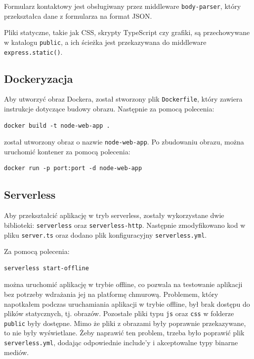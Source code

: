 \documentclass[a4paper,12pt]{article}
\begin{document}
Formularz kontaktowy jest obsługiwany przez middleware \texttt{body-parser}, który przekształca dane z formularza na format JSON.

Pliki statyczne, takie jak CSS, skrypty TypeScript czy grafiki, są przechowywane w katalogu \texttt{public}, a ich ścieżka jest przekazywana do middleware \texttt{express.static()}.

\subsection{Dockeryzacja}
Aby utworzyć obraz Dockera, został stworzony plik \texttt{Dockerfile}, który zawiera instrukcje dotyczące budowy obrazu. Następnie za pomocą polecenia:
\begin{lstlisting}
docker build -t node-web-app .
\end{lstlisting}
został utworzony obraz o nazwie \texttt{node-web-app}. Po zbudowaniu obrazu, można uruchomić kontener za pomocą polecenia:
\begin{lstlisting}
docker run -p port:port -d node-web-app
\end{lstlisting}

\subsection{Serverless}
Aby przekształcić aplikację w tryb serverless, zostały wykorzystane dwie biblioteki: \texttt{serverless} oraz \texttt{serverless-http}. Następnie zmodyfikowano kod w pliku \texttt{server.ts} oraz dodano plik konfiguracyjny \texttt{serverless.yml}.

Za pomocą polecenia:
\begin{lstlisting}
serverless start-offline
\end{lstlisting}
można uruchomić aplikację w trybie offline, co pozwala na testowanie aplikacji bez potrzeby wdrażania jej na platformę chmurową. Problemem, który napotkałem podczas uruchamiania aplikacji w trybie offline, był brak dostępu do plików statycznych, tj. obrazów. Pozostałe pliki typu \texttt{js} oraz \texttt{css} w folderze \texttt{public} były dostępne. Mimo że pliki z obrazami były poprawnie przekazywane, to nie były wyświetlane. Żeby naprawić ten problem, trzeba było poprawić plik \texttt{serverless.yml}, dodając odpowiednie include'y i akceptowalne typy binarne mediów.
\end{document}

